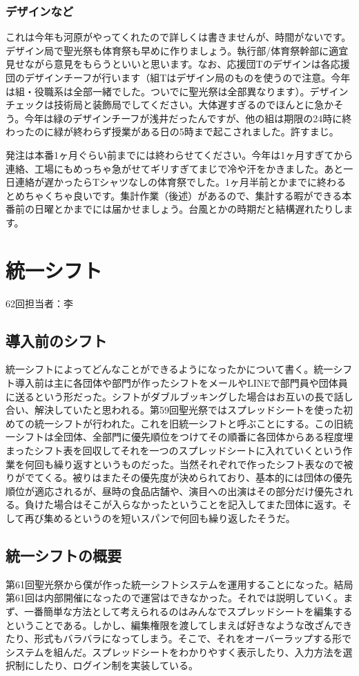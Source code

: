 \documentclass[dvipdfmx,jb5]{jreport}
\begin{document}
\subsubsection{デザインなど}
これは今年も河原がやってくれたので詳しくは書きませんが、時間がないです。デザイン局で聖光祭も体育祭も早めに作りましょう。執行部/体育祭幹部に適宜見せながら意見をもらうといいと思います。なお、応援団Tのデザインは各応援団のデザインチーフが行います（組Tはデザイン局のものを使うので注意。今年は組・役職系は全部一緒でした。ついでに聖光祭は全部異なります）。デザインチェックは技術局と装飾局でしてください。大体遅すぎるのでほんとに急かそう。今年は緑のデザインチーフが浅井だったんですが、他の組は期限の24時に終わったのに緑が終わらず授業がある日の5時まで起こされました。許すまじ。

発注は本番1ヶ月ぐらい前までには終わらせてください。今年は1ヶ月すぎてから連絡、工場にもめっちゃ急がせてギリすぎてまじで冷や汗をかきました。あと一日連絡が遅かったらTシャツなしの体育祭でした。1ヶ月半前とかまでに終わるとめちゃくちゃ良いです。集計作業（後述）があるので、集計する暇ができる本番前の日曜とかまでには届かせましょう。台風とかの時期だと結構遅れたりします。


\section{統一シフト}\label{sec:統一シフト}
62回担当者：李
\subsection{導入前のシフト}
統一シフトによってどんなことができるようになったかについて書く。統一シフト導入前は主に各団体や部門が作ったシフトをメールやLINEで部門員や団体員に送るという形だった。シフトがダブルブッキングした場合はお互いの長で話し合い、解決していたと思われる。第59回聖光祭ではスプレッドシートを使った初めての統一シフトが行われた。これを旧統一シフトと呼ぶことにする。この旧統一シフトは全団体、全部門に優先順位をつけてその順番に各団体からある程度埋まったシフト表を回収してそれを一つのスプレッドシートに入れていくという作業を何回も繰り返すというものだった。当然それぞれで作ったシフト表なので被りがでてくる。被りはまたその優先度が決められており、基本的には団体の優先順位が適応されるが、昼時の食品店舗や、演目への出演はその部分だけ優先される。負けた場合はそこが入らなかったということを記入してまた団体に返す。そして再び集めるというのを短いスパンで何回も繰り返したそうだ。
\subsection{統一シフトの概要}
第61回聖光祭から僕が作った統一シフトシステムを運用することになった。結局第61回は内部開催になったので運営はできなかった。それでは説明していく。まず、一番簡単な方法として考えられるのはみんなでスプレッドシートを編集するということである。しかし、編集権限を渡してしまえば好きなような改ざんできたり、形式もバラバラになってしまう。そこで、それをオーバーラップする形でシステムを組んだ。スプレッドシートをわかりやすく表示したり、入力方法を選択制にしたり、ログイン制を実装している。
\end{document}
